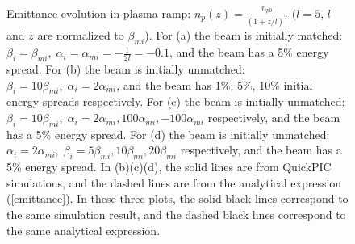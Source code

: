 \documentclass[%
reprint, superscriptaddress,
 amsmath,amssymb, aps,
prstab,
]{revtex4-2}
\begin{document}
\begin{figure}[!ht]
   \centering
   \quad
   \\
   \quad
   \caption{Emittance evolution in plasma ramp: $n_p(z) =
        \frac{n_{p0}}{(1+z/l)^2}$ $(l = 5$, $l$ and $z$ are normalized
        to $\beta_{mi}$). For (a) the
        beam is initially matched: $\beta_i = \beta_{mi},\;\alpha_i =
        \alpha_{mi} = -\frac{1}{2l} = -0.1 $, and the beam has a 5\% energy spread. For (b) the beam is initially unmatched: $\beta_i
        =10 \beta_{mi},\;\alpha_i =2 \alpha_{mi}$, and the beam has 1\%, 5\%, 10\% initial energy spreads respectively. For (c) the
        beam is initially unmatched: $\beta_i = 10\beta_{mi},\;\alpha_i =
        2\alpha_{mi}, 100\alpha_{mi}, -100\alpha_{mi}$ respectively, and the beam has a 5\% energy spread. For (d) the beam is initially unmatched: $\alpha_i =2 \alpha_{mi}, \; \beta_i
        =5 \beta_{mi},10 \beta_{mi}, 20 \beta_{mi}$ respectively, and the beam has a 5\% energy spread. In (b)(c)(d), the solid lines are from QuickPIC simulations, and the dashed lines are from the analytical expression (\ref{emittance}). In these three plots, the solid black lines correspond to the same simulation result, and the dashed black lines correspond to the same analytical expression.}
   \label{fig:emittance evolution in ramp}
\end{figure}
\end{document}
